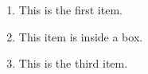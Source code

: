 \documentclass{beamer}
\begin{document}
\begin{frame}
  \begin{enumerate}
    \centering
    \item This is the first item.
    \item \begin{tcolorbox}[mybox]
            This item is inside a box.
          \end{tcolorbox}
    \item This is the third item.
  \end{enumerate}
\end{frame}
\end{document}
